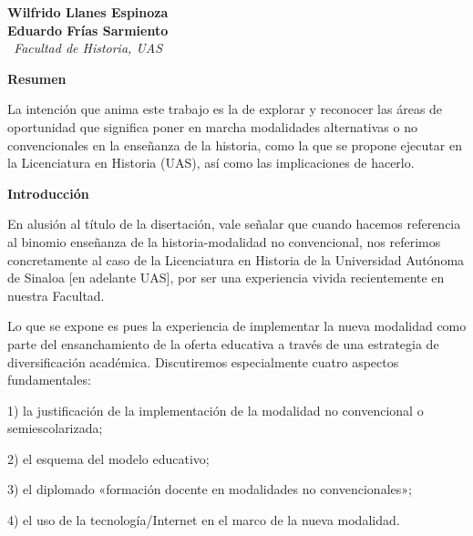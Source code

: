 %

\thispagestyle{empty}
{\par}
\setcounter{footnote}{0}


\bigskip
\begin{center}
{\bfseries Wilfrido Llanes Espinoza \\
Eduardo Frías Sarmiento}\\
{\itshape\ Facultad de Historia, UAS\/}
\end{center}


\bigskip
{\bfseries Resumen}

La intención que anima este trabajo es la de explorar  y reconocer las 
áreas de oportunidad que significa poner en marcha modalidades 
alternativas o no convencionales en la enseñanza de la historia, como 
la que se propone ejecutar en la Licenciatura en Historia (UAS), así 
como las implicaciones de hacerlo. 

\medskip
{\bfseries Introducción}

En alusión al título de la disertación, vale señalar que cuando hacemos 
referencia al binomio enseñanza de la historia-modalidad no 
convencional, nos referimos concretamente al caso de la Licenciatura en 
Historia de la Universidad Autónoma de Sinaloa [en adelante UAS], por 
ser una experiencia vivida recientemente en nuestra Facultad.

Lo que se expone es pues la experiencia de implementar la nueva 
modalidad como parte del ensanchamiento de la oferta educativa a través 
de una estrategia de diversificación académica. Discutiremos 
especialmente cuatro aspectos fundamentales: 
\begin{Obs}
\item[1)] la justificación de la 
implementación de la modalidad no convencional o semiescolarizada; 
\item[2)] el esquema del modelo educativo; 
\item[3)] el diplomado «formación docente en 
modalidades no convencionales»; 
\item[4)] el uso de la tecnología\slash{}Internet 
en  el marco de la nueva modalidad. 
\end{Obs}

